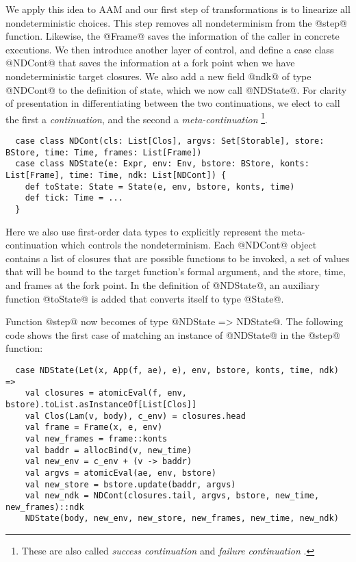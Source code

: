 \documentclass[acmsmall, review]{acmart}\settopmatter{}
\begin{document}
We apply this idea to AAM and our first step of transformations is to linearize all
nondeterministic choices. This step removes all nondeterminism from the @step@ function.
Likewise, the @Frame@ saves the information of the caller in concrete executions.
We then introduce another layer of control, and define a case class @NDCont@
that saves the information at a fork point when we have nondeterministic target closures.
We also add a new field @ndk@ of type @NDCont@ to the definition of state, which we now 
call @NDState@. For clarity of presentation in differentiating between the two continuations, 
we elect to call the first a \emph{continuation}, and the second a \emph{meta-continuation}
\footnote{These are also called \emph{success continuation} and \emph{failure
continuation} \cite{Danvy:1990:AC:91556.91622}.}.

\begin{lstlisting}
  case class NDCont(cls: List[Clos], argvs: Set[Storable], store: BStore, time: Time, frames: List[Frame])
  case class NDState(e: Expr, env: Env, bstore: BStore, konts: List[Frame], time: Time, ndk: List[NDCont]) {
    def toState: State = State(e, env, bstore, konts, time)
    def tick: Time = ...
  }
\end{lstlisting}

Here we also use first-order data types to explicitly represent the meta-continuation which
controls the nondeterminism.
Each @NDCont@ object contains a list of closures that are possible functions to be invoked,
a set of values that will be bound to the target function's formal argument, and the store, time,
and frames at the fork point. In the definition of @NDState@, an auxiliary function @toState@
is added that converts itself to type @State@.

Function @step@ now becomes of type @NDState => NDState@.
The following code shows the first case of matching an instance of @NDState@ in
the @step@ function:

\begin{lstlisting}
  case NDState(Let(x, App(f, ae), e), env, bstore, konts, time, ndk) =>
    val closures = atomicEval(f, env, bstore).toList.asInstanceOf[List[Clos]]
    val Clos(Lam(v, body), c_env) = closures.head
    val frame = Frame(x, e, env)
    val new_frames = frame::konts
    val baddr = allocBind(v, new_time)
    val new_env = c_env + (v -> baddr)
    val argvs = atomicEval(ae, env, bstore)
    val new_store = bstore.update(baddr, argvs)
    val new_ndk = NDCont(closures.tail, argvs, bstore, new_time, new_frames)::ndk
    NDState(body, new_env, new_store, new_frames, new_time, new_ndk)
\end{lstlisting}
\end{document}
